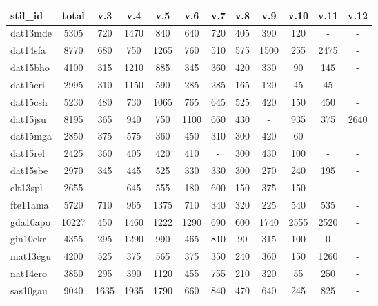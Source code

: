 \documentclass[paper=a4, fontsize=11pt,twoside]{article}
\begin{document}
\begin{tabular}{|l|c|c|c|c|c|c|c|c|c|c|c|}
\hline
{\fontsize{8pt}{0.2cm}\selectfont stil\_id} & {\fontsize{8pt}{0.2cm}\selectfont
total} & {\fontsize{8pt}{0.2cm}\selectfont v.3} &
{\fontsize{8pt}{0.2cm}\selectfont v.4} & {\fontsize{8pt}{0.2cm}\selectfont v.5}
& {\fontsize{8pt}{0.2cm}\selectfont v.6} & {\fontsize{8pt}{0.2cm}\selectfont v.7}
& {\fontsize{8pt}{0.2cm}\selectfont v.8} & {\fontsize{8pt}{0.2cm}\selectfont v.9}
& {\fontsize{8pt}{0.2cm}\selectfont v.10} & {\fontsize{8pt}{0.2cm}\selectfont
v.11} & {\fontsize{8pt}{0.2cm}\selectfont v.12} \\
\hline
dat13mde & 5305 & 720 & 1470 & 840 & 640 & 720 & 405 & 390 & 120 & - & - \\
\hline
dat14sfa & 8770 & 680 & 750 & 1265 & 760 & 510 & 575 & 1500 & 255 & 2475 & - \\
\hline
dat15bho & 4100 & 315 & 1210 & 885 & 345 & 360 & 420 & 330 & 90 & 145 & - \\
\hline
dat15cri & 2995 & 310 & 1150 & 590 & 285 & 285 & 165 & 120 & 45 & 45 & - \\
\hline
dat15csh & 5230 & 480 & 730 & 1065 & 765 & 645 & 525 & 420 & 150 & 450 & - \\
\hline
dat15jsu & 8195 & 365 & 940 & 750 & 1100 & 660 & 430 & - & 935 & 375 & 2640 \\
\hline
dat15mga & 2850 & 375 & 575 & 360 & 450 & 310 & 300 & 420 & 60 & - & - \\
\hline
dat15rel & 2425 & 360 & 405 & 420 & 410 & - & 300 & 430 & 100 & - & - \\
\hline
dat15sbe & 2970 & 345 & 445 & 525 & 330 & 330 & 300 & 270 & 240 & 195 & - \\
\hline
elt13spl & 2655 & - & 645 & 555 & 180 & 600 & 150 & 375 & 150 & - & - \\
\hline
fte11ama & 5720 & 710 & 965 & 1375 & 710 & 340 & 320 & 225 & 540 & 535 & - \\
\hline
gda10apo & 10227 & 450 & 1460 & 1222 & 1290 & 690 & 600 & 1740 & 2555 & 2520 & -
\\
\hline
gin10ekr & 4355 & 295 & 1290 & 990 & 465 & 810 & 90 & 315 & 100 & 0 & - \\
\hline
mat13cgu & 4200 & 525 & 375 & 565 & 375 & 350 & 240 & 360 & 150 & 1260 & - \\
\hline
nat14ero & 3850 & 295 & 390 & 1120 & 455 & 755 & 210 & 320 & 55 & 250 & - \\
\hline
sas10gau & 9040 & 1635 & 1935 & 1790 & 660 & 840 & 470 & 640 & 245 & 825 & -\\
\hline
\end{tabular}
\end{document}
